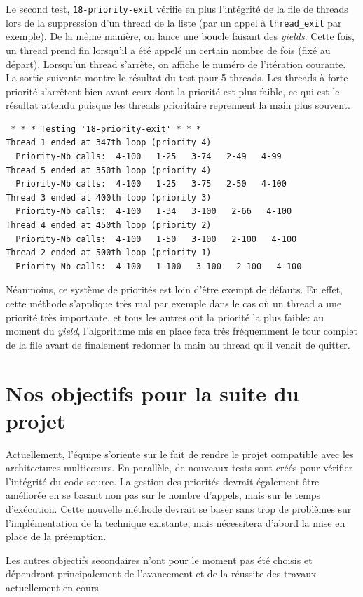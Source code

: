 \documentclass[a4paper,11pt]{article}
\begin{document}
Le second test, \texttt{18-priority-exit} vérifie en plus l'intégrité de la file de threads lors de la suppression d'un thread de la liste (par un appel à \texttt{thread\_exit} par exemple). De la même manière, on lance une boucle faisant des \textit{yields}. Cette fois, un thread prend fin lorsqu'il a été appelé un certain nombre de fois (fixé au départ). Lorsqu'un thread s'arrète, on affiche le numéro de l'itération courante. La sortie suivante montre le résultat du test pour 5 threads. Les threads à forte priorité s’arrêtent bien avant ceux dont la priorité est plus faible, ce qui est le résultat attendu puisque les threads prioritaire reprennent la main plus souvent.
\begin{verbatim}
 * * * Testing '18-priority-exit' * * *
Thread 1 ended at 347th loop (priority 4)
  Priority-Nb calls:  4-100   1-25   3-74   2-49   4-99  
Thread 5 ended at 350th loop (priority 4)
  Priority-Nb calls:  4-100   1-25   3-75   2-50   4-100  
Thread 3 ended at 400th loop (priority 3)
  Priority-Nb calls:  4-100   1-34   3-100   2-66   4-100  
Thread 4 ended at 450th loop (priority 2)
  Priority-Nb calls:  4-100   1-50   3-100   2-100   4-100  
Thread 2 ended at 500th loop (priority 1)
  Priority-Nb calls:  4-100   1-100   3-100   2-100   4-100
\end{verbatim}

Néanmoins, ce système de priorités est loin d'être exempt de défauts. En effet, cette méthode s'applique très mal par exemple dans le cas où un thread a une priorité très importante, et tous les autres ont la priorité la plus faible: au moment du \textit{yield}, l'algorithme mis en place fera très fréquemment le tour complet de la file avant de finalement redonner la main au thread qu'il venait de quitter.


\section{Nos objectifs pour la suite du projet}

Actuellement, l'équipe s'oriente sur le fait de rendre le projet compatible avec les architectures multic\oe urs. En parallèle, de nouveaux tests sont créés pour vérifier l'intégrité du code source. La gestion des priorités devrait également \^etre améliorée en se basant non pas sur le nombre d'appels, mais sur le temps d'exécution. Cette nouvelle méthode devrait se baser sans trop de problèmes sur l'implémentation de la technique existante, mais nécessitera d'abord la mise en place de la préemption.

Les autres objectifs secondaires n'ont pour le moment pas été choisis et dépendront principalement de l'avancement et de la réussite des travaux actuellement en cours.
\end{document}
